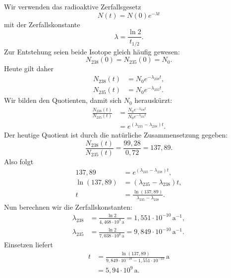 \documentclass[11pt,a4paper]{scrartcl}
\begin{document}
\begin{enumerate}[label=(\alph*)]
            \begin{calculationbox}
                Wir verwenden das radioaktive Zerfallsgesetz
                \[
                    N(t)=N(0)e^{-\lambda t}
                \]
                mit der Zerfallskonstante
                \[
                    \lambda=\frac{\ln 2}{t_{1/2}}.
                \]
                Zur Entstehung seien beide Isotope gleich häufig gewesen:
                \[
                    N_{238}(0)=N_{235}(0)=N_0.
                \]
                Heute gilt daher
                \begin{align*}
                    N_{238}(t)&=N_0 e^{-\lambda_{238}t},\\
                    N_{235}(t)&=N_0 e^{-\lambda_{235}t}.
                \end{align*}
                Wir bilden den Quotienten, damit sich $N_0$ herauskürzt:
                \begin{align*}
                    \frac{N_{238}(t)}{N_{235}(t)}
                    &=\frac{N_0e^{-\lambda_{238}t}}{N_0e^{-\lambda_{235}t}}\\
                    &=e^{(\lambda_{235}-\lambda_{238})t}.
                \end{align*}
                Der heutige Quotient ist durch die natürliche Zusammensetzung gegeben:
                \[
                    \frac{N_{238}(t)}{N_{235}(t)}=\frac{99{,}28}{0{,}72}=137{,}89.
                \]
                Also folgt
                \begin{align*}
                    137{,}89&=e^{(\lambda_{235}-\lambda_{238})t},\\
                    \ln(137{,}89)&=(\lambda_{235}-\lambda_{238})t,\\
                    t&=\frac{\ln(137{,}89)}{\lambda_{235}-\lambda_{238}}.
                \end{align*}
                Nun berechnen wir die Zerfallskonstanten:
                \begin{align*}
                    \lambda_{238}
                    &=\frac{\ln 2}{4{,}468\cdot 10^9\,\mathrm{a}}
                    =1{,}551\cdot 10^{-10}\,\mathrm{a}^{-1},\\
                    \lambda_{235}
                    &=\frac{\ln 2}{7{,}038\cdot 10^8\,\mathrm{a}}
                    =9{,}849\cdot 10^{-10}\,\mathrm{a}^{-1}.
                \end{align*}
                Einsetzen liefert
                \begin{align*}
                    t
                    &=\frac{\ln(137{,}89)}{9{,}849\cdot10^{-10}-1{,}551\cdot10^{-10}}\,\mathrm{a}\\
                    &=5{,}94\cdot 10^9\,\mathrm{a}.
                \end{align*}
            \end{calculationbox}


\end{enumerate}
\end{document}

